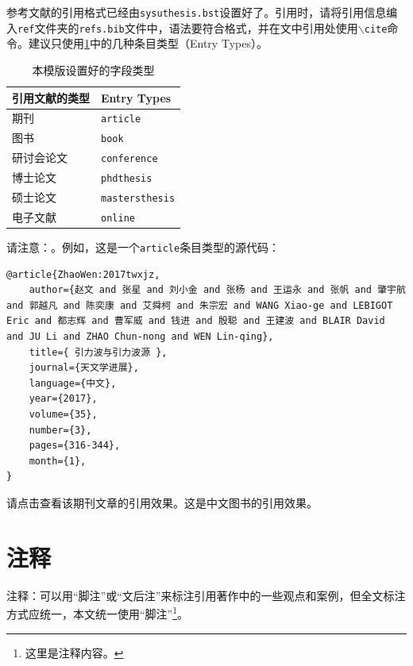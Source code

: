 参考文献的引用格式已经由\texttt{sysuthesis.bst}设置好了。引用时，请将引用信息编入\texttt{ref}文件夹的\texttt{refs.bib}文件中，语法要符合格式，并在文中引用处使用\texttt{$\backslash$cite}命令。建议只使用\ref{tab:entrytypes}中的几种条目类型（Entry Types）。
\begin{table}[!htp]
    \caption{本模版设置好的字段类型}
    \label{tab:entrytypes}
    \centering
    \begin{tabular}{ll}
    \hline
    引用文献的类型 & Entry Types \\
    \hline
    期刊    & \texttt{article} \\
    图书    & \texttt{book} \\
    研讨会论文    & \texttt{conference} \\  
    博士论文    & \texttt{phdthesis} \\
    硕士论文    & \texttt{mastersthesis} \\
    电子文献   & \texttt{online} \\
    \hline
    \end{tabular}
\end{table}
请注意：。例如，这是一个\texttt{article}条目类型的源代码：
\begin{lstlisting}
@article{ZhaoWen:2017twxjz,
    author={赵文 and 张星 and 刘小金 and 张杨 and 王运永 and 张帆 and 肇宇航 and 郭越凡 and 陈奕康 and 艾舜柯 and 朱宗宏 and WANG Xiao-ge and LEBIGOT Eric and 都志辉 and 曹军威 and 钱进 and 殷聪 and 王建波 and BLAIR David and JU Li and ZHAO Chun-nong and WEN Lin-qing},
    title={ 引力波与引力波源 },
    journal={天文学进展},
    language={中文},
    year={2017},
    volume={35},
    number={3},
    pages={316-344},
    month={1},
}
\end{lstlisting}
请点击\cite{ZhaoWen:2017twxjz}查看该期刊文章的引用效果。这是中文图书的引用效果\cite{Huang:2012hxwl}。

\section{注释}
注释：可以用“脚注”或“文后注”来标注引用著作中的一些观点和案例，但全文标注方式应统一，本文统一使用“脚注”\footnote{这里是注释内容。}。
